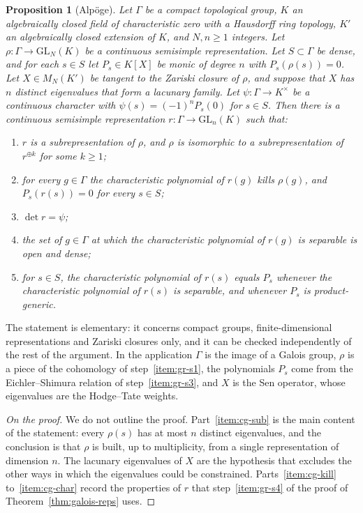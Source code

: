 \documentclass[11pt]{amsbook}
\theoremstyle{plain}
\newtheorem{proposition}[theorem]{Proposition}
\theoremstyle{definition}
\theoremstyle{remark}
\numberwithin{equation}{section}
\numberwithin{figure}{chapter}
\numberwithin{table}{chapter}
\begin{document}
\begin{proposition}[Alp\"oge]\label{prop:compact-group}
Let $\Gamma$ be a compact topological group, $K$ an algebraically
closed field of characteristic zero with a Hausdorff ring topology,
$K'$ an algebraically closed extension of $K$, and $N,n\ge1$ integers.
Let $\rho\colon\Gamma\to\mathrm{GL}_N(K)$ be a continuous semisimple
representation. Let $S\subset\Gamma$ be dense, and for each $s\in S$
let $P_s\in K[X]$ be monic of degree $n$ with $P_s(\rho(s))=0$. Let
$X\in M_N(K')$ be tangent to the Zariski closure of $\rho$, and suppose
that $X$ has $n$ distinct eigenvalues that form a lacunary family. Let
$\psi\colon\Gamma\to K^\times$ be a continuous character with
$\psi(s)=(-1)^nP_s(0)$ for $s\in S$. Then there is a continuous
semisimple representation $r\colon\Gamma\to\mathrm{GL}_n(K)$ such that:
\begin{enumerate}[label=(\alph*)]
\item\label{item:cg-sub} $r$ is a subrepresentation of $\rho$, and
$\rho$ is isomorphic to a subrepresentation of $r^{\oplus k}$ for some
$k\ge1$;
\item\label{item:cg-kill} for every $g\in\Gamma$ the characteristic
polynomial of $r(g)$ kills $\rho(g)$, and $P_s(r(s))=0$ for every
$s\in S$;
\item\label{item:cg-det} $\det r=\psi$;
\item\label{item:cg-sep} the set of $g\in\Gamma$ at which the
characteristic polynomial of $r(g)$ is separable is open and dense;
\item\label{item:cg-char} for $s\in S$, the characteristic polynomial
of $r(s)$ equals $P_s$ whenever the characteristic polynomial of
$r(s)$ is separable, and whenever $P_s$ is product-generic.
\end{enumerate}
\end{proposition}

\noindent The statement is elementary: it concerns compact groups,
finite-dimensional representations and Zariski closures only, and it
can be checked independently of the rest of the argument. In the
application $\Gamma$ is the image of a Galois group, $\rho$ is a piece
of the cohomology of step~\ref{item:gr-s1}, the polynomials $P_s$ come from the
Eichler--Shimura relation of step~\ref{item:gr-s3}, and $X$ is the Sen operator,
whose eigenvalues are the Hodge--Tate weights.

\begin{proof}[On the proof]
We do not outline the proof. Part~\ref{item:cg-sub} is the main content of
the statement: every $\rho(s)$ has at most $n$ distinct eigenvalues,
and the conclusion is that $\rho$ is built, up to multiplicity, from a
single representation of dimension $n$. The lacunary eigenvalues of
$X$ are the hypothesis that excludes the other ways in which the
eigenvalues could be constrained. Parts~\ref{item:cg-kill}
to~\ref{item:cg-char} record the properties of $r$ that step~\ref{item:gr-s4} of
the proof of Theorem~\ref{thm:galois-reps} uses.
\end{proof}
\end{document}
